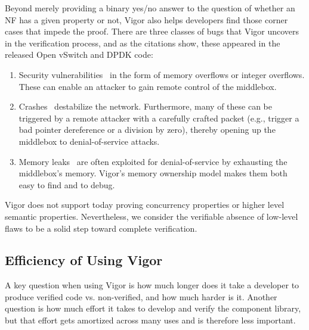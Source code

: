 \documentclass[letterpaper,twocolumn,10pt]{article}
\begin{document}
Beyond merely providing a binary yes/no answer to the question of whether an NF
has a given property or not, Vigor also helps developers find those corner cases
that impede the proof. There are three classes of bugs that Vigor uncovers in
the verification process, and as the citations show, these appeared in the
released Open vSwitch and DPDK code:
\begin{enumerate}

\item Security vulnerabilities~\cite{bug:ovs-uaf, bug:dpdk-uaf1, bug:dpdk-uaf2,
    bug:ovs-faf, bug:ovs-overflow, bug:dpdk-overflow1, bug:dpdk-overflow2,
    bug:ovs-int-overflow, bug:dpdk-int-overflow} in the form of memory overflows
  or integer overflows. These can enable an attacker to gain remote control of
  the middlebox.
    
\item Crashes~\cite{bug:ovs-0ptr, bug:dpdk-0ptr1, bug:dpdk-0ptr2,
    bug:dpdk-0ptr3} destabilize the network. Furthermore, many of these can be
  triggered by a remote attacker with a carefully crafted packet (e.g., trigger
  a bad pointer dereference or a division by zero), thereby opening up the
  middlebox to denial-of-service attacks.

\item Memory leaks~\cite{bug:ovs-mem-leak1, bug:ovs-mem-leak2,
    bug:ovs-mem-leak3, bug:ovs-mem-leak4, bug:dpdk-mem-leak1,
    bug:dpdk-mem-leak2} are often exploited for denial-of-service by exhausting
  the middlebox's memory. Vigor's memory ownership model makes them both easy to
  find and to debug.

\end{enumerate}

Vigor does not support today proving concurrency properties or higher level
semantic properties. Nevertheless, we consider the verifiable absence of
low-level flaws to be a solid step toward complete verification.

\subsection{Efficiency of Using Vigor}
\label{sec:efficiency}

A key question when using Vigor is how much longer does it take a developer to
produce verified code vs. non-verified, and how much harder is it. Another
question is how much effort it takes to develop and verify the component
library, but that effort gets amortized across many uses and is therefore less
important.
\end{document}
